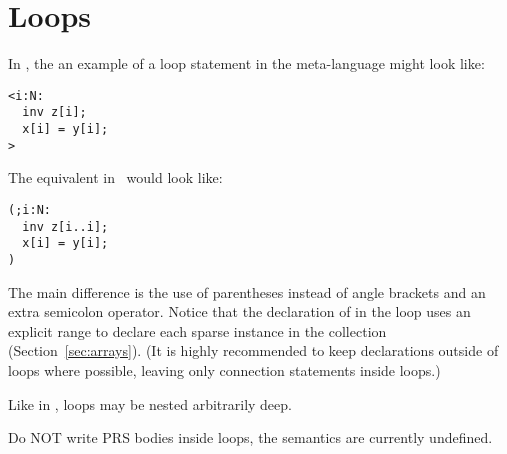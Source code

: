 
\section{Loops}
\label{sec:loops}

In \CAST, the an example of a loop statement in the meta-language
might look like:

\begin{verbatim}
<i:N:
  inv z[i];
  x[i] = y[i];
>
\end{verbatim}

The equivalent in \hac\ would look like:

\begin{verbatim}
(;i:N:
  inv z[i..i];
  x[i] = y[i];
)
\end{verbatim}

The main difference is the use of parentheses instead of 
angle brackets and an extra semicolon operator.  
Notice that the declaration of  in the loop uses
an explicit range to declare each sparse instance 
in the collection (Section~\ref{sec:arrays}).  
(It is highly recommended to keep declarations outside of 
loops where possible, leaving only connection statements inside loops.)

Like in \CAST, loops may be nested arbitrarily deep.  

Do NOT write PRS bodies inside loops, the semantics are currently
undefined.  

